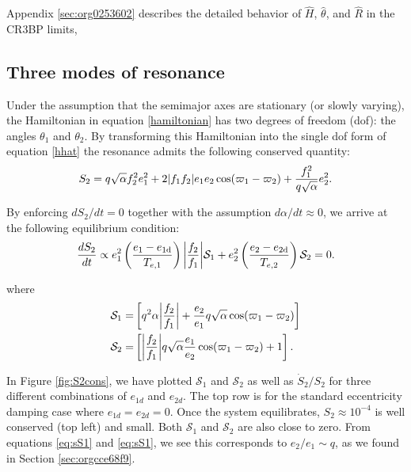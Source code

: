 \documentclass[usenatbib]{mnras}
\DeclarePairedDelimiter{\abs}{|}{|}
\begin{document}
\noindent
Appendix \ref{sec:org0253602}
describes the detailed behavior of \(\hat H\), \(\hat \theta\),
and \(\hat R\) in the CR3BP limits,

\subsection{Three modes of resonance}
\label{sec:org19d6c10}
Under the assumption that the semimajor axes are stationary (or slowly
varying), the Hamiltonian in equation \eqref{hamiltonian} has two
degrees of freedom (dof): the angles \(\theta_1\) and \(\theta_2\).  By
transforming this Hamiltonian into the single dof form of equation
\eqref{hhat} the resonance admits the following conserved quantity:
\begin{align}
  \label{eq:s2}
  S_2 = q\sqrt{\alpha}f_2^2e_1^2
+2\abs{f_1f_2}e_1e_2\cos(\varpi_1-\varpi_2) + \frac{f_1^2}{q\sqrt\alpha}e_2^2.
\end{align}

By enforcing \(dS_2/dt = 0\) together with the assumption \(d\alpha/dt
\approx 0\), we arrive at the following equilibrium condition:
\begin{align}
  \label{eq:S2eq}
  \frac{dS_2}{dt} \propto e_1^2\left(\frac{e_1-e_{1\rm d}}{T_{e,1}}\right)\abs*{\frac{f_2}{f_1}}
  \mathcal{S}_1
  + e_2^2\left(\frac{e_2-e_{2\rm d}}{T_{e,2}}\right)
  \mathcal{S}_2
  = 0.
\end{align}

\noindent
where
\begin{align}
  \label{eq:sS1}
  \mathcal{S}_1=&\left[
                  q^2\alpha\abs*{\frac{f_2}{f_1}}
                  + \frac{e_2}{e_1}q\sqrt{\alpha}\cos(\varpi_1-\varpi_2)
                  \right]\\
  \label{eq:sS2}
  \mathcal{S}_2=&\left[
                  \abs*{\frac{f_2}{f_1}} q\sqrt{\alpha}
                  \frac{e_1}{e_2}\cos(\varpi_1-\varpi_2) + 1
                  \right].
\end{align}

In Figure \ref{fig:S2cons}, we have plotted \(\mathcal{S}_1\) and
\(\mathcal{S}_2\) as well as \(\dot S_2/S_2\) for three different
combinations of \(e_{1d}\) and \(e_{2d}\).  The top row is for the
standard eccentricity damping case where \(e_{1d}=e_{2d}=0\).  Once the
system equilibrates, \(S_2\approx 10^{-4}\) is well conserved (top left) and
small. Both \(\mathcal{S}_1\) and \(\mathcal{S}_2\) are also close to
zero. From equations \eqref{eq:sS1} and \eqref{eq:sS1}, we see this
corresponds to \(e_2/e_1 \sim q\), as we found in Section \ref{sec:orgcce68f9}.
\end{document}
